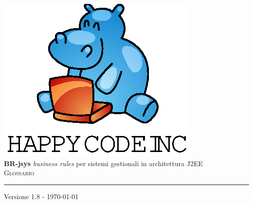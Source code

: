 \documentclass[11pt,titlepage,a4paper]{report}
\begin{document}
\newcommand{\lv}{ 1.8 } %
\newcommand{\dt}{ Glossario }%


\begin{titlepage}\begin{center}
\vspace*{0.5in}
\includegraphics{logo.eps}
\vspace*{0.2in} \\
{\Large \textbf{BR-jsys}}
{\Large \emph{business rules} per sistemi gestionali in architettura J2EE } 
\vspace{2in} \\
\Huge \textsc{ \dt }
\par\rule{10cm}{0.4pt} \par {\large Versione \lv - \today} \\
\end{center}\end{titlepage}
\vspace*{0.5in}
\end{document}
